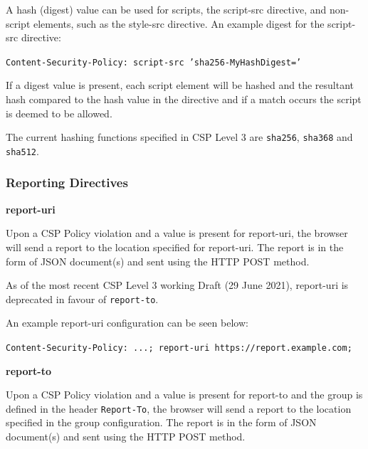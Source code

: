 \documentclass{mscreport}
\begin{document}
\vspace{0.3cm} \noindent
A hash (digest) value can be used for scripts, the script-src directive, and non-script elements, such as the style-src directive. An example digest for the script-src directive:

\vspace{0.3cm} \noindent
\texttt{Content-Security-Policy: script-src 'sha256-MyHashDigest='}

\vspace{0.3cm} \noindent
If a digest value is present, each script element will be hashed and the resultant hash compared to the hash value in the directive and if a match occurs the script is deemed to be allowed.

\vspace{0.3cm} \noindent
The current hashing functions specified in CSP Level 3 are \texttt{sha256}, \texttt{sha368} and \texttt{sha512}.

\subsubsection{Reporting Directives}

\textbf{report-uri}

\vspace{0.3cm} \noindent
Upon a CSP Policy violation and a value is present for report-uri, the browser will send a report to the location specified for report-uri. The report is in the form of JSON document(s) and sent using the HTTP POST method.

\vspace{0.3cm} \noindent
As of the most recent CSP Level 3 working Draft (29 June 2021), report-uri is deprecated in favour of \texttt{report-to}.

\vspace{0.3cm} \noindent
An example report-uri configuration can be seen below:

\vspace{0.3cm} \noindent
\texttt{Content-Security-Policy: ...; report-uri https://report.example.com;}

\vspace{0.7cm} \noindent
\textbf{report-to}

\vspace{0.3cm} \noindent
Upon a CSP Policy violation and a value is present for report-to and the group is defined in the header \texttt{Report-To}, the browser will send a report to the location specified in the group configuration. The report is in the form of JSON document(s) and sent using the HTTP POST method.
\end{document}
